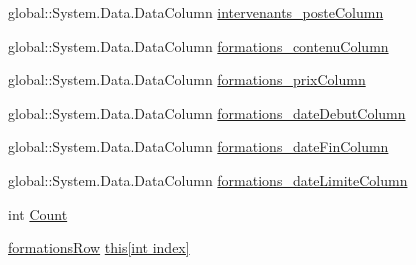 \begin{DoxyCompactItemize}
\item 
global\+::\+System.\+Data.\+Data\+Column \hyperlink{classforma_1_1formadb_data_set_1_1formations_data_table_a25d7b74282fe7a56057256138b1208f6}{intervenants\+\_\+poste\+Column}
\item 
global\+::\+System.\+Data.\+Data\+Column \hyperlink{classforma_1_1formadb_data_set_1_1formations_data_table_a8176ccada3f09aa76ddd618cb2a9ba45}{formations\+\_\+contenu\+Column}
\item 
global\+::\+System.\+Data.\+Data\+Column \hyperlink{classforma_1_1formadb_data_set_1_1formations_data_table_a70dcdd045c0e2ede6ea5c27aa14c0b7e}{formations\+\_\+prix\+Column}
\item 
global\+::\+System.\+Data.\+Data\+Column \hyperlink{classforma_1_1formadb_data_set_1_1formations_data_table_ade0c285848b509792cb6fb2965068199}{formations\+\_\+date\+Debut\+Column}
\item 
global\+::\+System.\+Data.\+Data\+Column \hyperlink{classforma_1_1formadb_data_set_1_1formations_data_table_ac48a14e412e1c7254c3a421dff3d7514}{formations\+\_\+date\+Fin\+Column}
\item 
global\+::\+System.\+Data.\+Data\+Column \hyperlink{classforma_1_1formadb_data_set_1_1formations_data_table_a651c90fc15f317fbd7e8dc24a1051c61}{formations\+\_\+date\+Limite\+Column}
\item 
int \hyperlink{classforma_1_1formadb_data_set_1_1formations_data_table_aa4b571a0eb194b32589b73e91b83653a}{Count}
\item 
\hyperlink{classforma_1_1formadb_data_set_1_1formations_row}{formations\+Row} \hyperlink{classforma_1_1formadb_data_set_1_1formations_data_table_a6a681b5e26b2045bc09c1e6425ef35b8}{this\mbox{[}int index\mbox{]}}
\end{DoxyCompactItemize}
